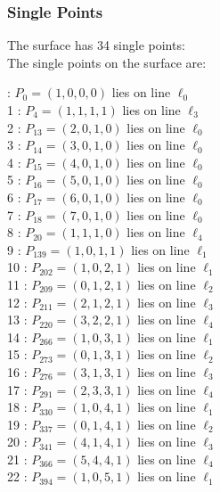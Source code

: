 \documentclass{article}
\begin{document}
{\subsubsection*{Single Points}
The surface has 34 single points:\\
The single points on the surface are:\\
\begin{multicols}{2}
 : $P_{0}=( 1, 0, 0, 0 )$ lies on line $\ell_{0}$\\
1 : $P_{4}=( 1, 1, 1, 1 )$ lies on line $\ell_{3}$\\
2 : $P_{13}=( 2, 0, 1, 0 )$ lies on line $\ell_{0}$\\
3 : $P_{14}=( 3, 0, 1, 0 )$ lies on line $\ell_{0}$\\
4 : $P_{15}=( 4, 0, 1, 0 )$ lies on line $\ell_{0}$\\
5 : $P_{16}=( 5, 0, 1, 0 )$ lies on line $\ell_{0}$\\
6 : $P_{17}=( 6, 0, 1, 0 )$ lies on line $\ell_{0}$\\
7 : $P_{18}=( 7, 0, 1, 0 )$ lies on line $\ell_{0}$\\
8 : $P_{20}=( 1, 1, 1, 0 )$ lies on line $\ell_{4}$\\
9 : $P_{139}=( 1, 0, 1, 1 )$ lies on line $\ell_{1}$\\
10 : $P_{202}=( 1, 0, 2, 1 )$ lies on line $\ell_{1}$\\
11 : $P_{209}=( 0, 1, 2, 1 )$ lies on line $\ell_{2}$\\
12 : $P_{211}=( 2, 1, 2, 1 )$ lies on line $\ell_{3}$\\
13 : $P_{220}=( 3, 2, 2, 1 )$ lies on line $\ell_{4}$\\
14 : $P_{266}=( 1, 0, 3, 1 )$ lies on line $\ell_{1}$\\
15 : $P_{273}=( 0, 1, 3, 1 )$ lies on line $\ell_{2}$\\
16 : $P_{276}=( 3, 1, 3, 1 )$ lies on line $\ell_{3}$\\
17 : $P_{291}=( 2, 3, 3, 1 )$ lies on line $\ell_{4}$\\
18 : $P_{330}=( 1, 0, 4, 1 )$ lies on line $\ell_{1}$\\
19 : $P_{337}=( 0, 1, 4, 1 )$ lies on line $\ell_{2}$\\
20 : $P_{341}=( 4, 1, 4, 1 )$ lies on line $\ell_{3}$\\
21 : $P_{366}=( 5, 4, 4, 1 )$ lies on line $\ell_{4}$\\
22 : $P_{394}=( 1, 0, 5, 1 )$ lies on line $\ell_{1}$\\

\end{multicols}}
\end{document}
